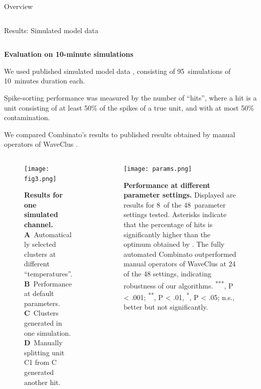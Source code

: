 \documentclass{beamer}
\renewcommand{\emph}{\textbf}
\newenvironment{wideitemize}{\itemize\addtolength{\itemsep}{.2em}\addtolength{\labelsep}{.1ex}}{\enditemize}
\begin{document}
\begin{frame}[t]
\begin{columns}[T]
\begin{column}{.49\linewidth}
\begin{block}{Overview}
\begin{columns}[T]
\begin{column}{.57\linewidth}
\end{column}
\end{columns}
\end{block}


  \begin{block}{Results: Simulated model data}

\begin{columns}[T]
\begin{column}{.95\linewidth}
\emph{Evaluation on 10-minute simulations}
        \begin{wideitemize}
    \item We used published simulated model data \parencite{pedreira_how_2012}, consisting of 95~simulations of 10~minutes duration each.
    \item Spike-sorting performance was measured by the number of ``hits'', where a hit is a unit consisting of at least 50\% of the spikes of a true unit, and with at most 50\% contamination.
    \item We compared Combinato's results to published results \parencite{pedreira_how_2012} obtained by manual operators of WaveClus \parencite{quian_quiroga_unsupervised_2004}.
    \end{wideitemize}

  
\begin{columns}[T]
  \begin{column}{.47\linewidth}

    \begin{figure}
\label{fig:results_sim}
\begin{center}
\texttt{[image: fig3.png]}
\end{center}
\caption{\emph{Results for one simulated channel.} \textbf{A}~Automatically selected clusters at different ``temperatures''. \textbf{B}~Performance at default parameters. \textbf{C}~Clusters generated in one simulation. \textbf{D}~Manually splitting unit C1 from C generated another hit.}
\end{figure}
\end{column}
\begin{column}{.48\linewidth}


  \begin{figure}
\label{fig:results_sim}
\begin{center}
\texttt{[image: params.png]}
\end{center}
\caption{\emph{Performance at different parameter settings.} Displayed are results for 8~of the 48~parameter settings tested. Asterisks indicate that the percentage of hits is significantly higher than the optimum obtained by \cite{pedreira_how_2012}. The fully automated Combinato outperformed manual operators of WaveClus at 24 of the 48 settings, indicating robustness of our algorithms. \textsuperscript{***}, P < .001; \textsuperscript{**}, P < .01, \textsuperscript{*}, P < .05; n.s., better but not significantly.}
\end{figure}


\end{column}
\end{columns}
\end{column}
\end{columns}
\end{block}
\end{column}
\end{columns}
\end{frame}
\end{document}
